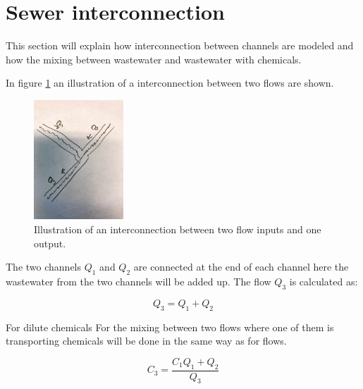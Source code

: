 \section{Sewer interconnection}\label{se:sewer_interconnection}
This section will explain how interconnection between channels are modeled and how the mixing between wastewater and wastewater with chemicals.

In figure \ref{fig:interconnections} an illustration of a interconnection between two flows are shown.

\begin{figure}[H]
\centering
\includegraphics[width=0.30\textwidth]{report/modeling/pictures/interconnections.jpg}
\caption{Illustration of an interconnection between two flow inputs and one output.}
\label{fig:interconnections}
\end{figure} 

The two channels $Q_1$ and $Q_2$ are connected at the end of each channel here the wastewater from the two channels will be added up. The flow $Q_3$ is calculated as:

\begin{equation}
	Q_3 = Q_1 + Q_2 	
\end{equation} 

For dilute chemicals For the mixing between two flows where one of them is transporting chemicals will be done in the same way as for flows. 

\begin{equation}
	C_3 = \frac{C_1 Q_1 + Q_2}{Q_3}
\end{equation}

